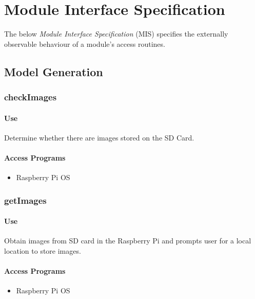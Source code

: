 \documentclass[10pt,letterpaper]{article}
\begin{document}
\newpage


\section{Module Interface Specification}
The below \textit{Module Interface Specification} (MIS) specifies the externally observable behaviour of a module's access routines.
\subsection{Model Generation}
\subsubsection{checkImages}
\paragraph{Use}
Determine whether there are images stored on the SD Card.
\paragraph{Access Programs}
\begin{itemize}
	\item Raspberry Pi OS
\end{itemize}
\begin{table}[H]
  \caption{checkImages}
\end{table}

\subsubsection{getImages}
\paragraph{Use}
Obtain images from SD card in the Raspberry Pi and prompts user for a local location to store images.
\paragraph{Access Programs}
\begin{itemize}
	\item Raspberry Pi OS
\end{itemize}
\begin{table}[H]
  \caption{getImages}
\end{table}
\end{document}
